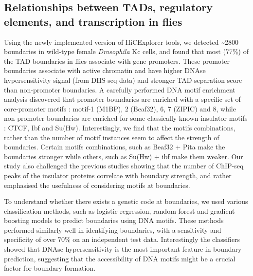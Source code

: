 \documentclass[11pt,twoside]{MPIthesis}
\theoremstyle{definition}
\theoremstyle{definition}
\theoremstyle{definition}
\theoremstyle{remark}
\begin{document}
\subsection{Relationships between TADs, regulatory elements, and
transcription in
flies}\label{relationships-between-tads-regulatory-elements-and-transcription-in-flies}

Using the newly implemented version of HiCExplorer tools, we detected
\textasciitilde{}2800 boundaries in wild-type female \emph{Drosophila}
Kc cells, and found that most (77\%) of the TAD boundaries in flies
associate with gene promoters. These promoter boundaries associate with
active chromatin and have higher DNAse hypersensitivity signal (from
DHS-seq data) and stronger TAD-separation score than non-promoter
boundaries. A carefully performed DNA motif enrichment analysis
discovered that promoter-boundaries are enriched with a specific set of
core-promoter motifs : motif-1 (M1BP), 2 (Beaf32), 6, 7 (ZIPIC) and 8,
while non-promoter boundaries are enriched for some classically known
insulator motifs : CTCF, Ibf and Su(Hw). Interestingly, we find that the
motifs combinations, rather than the number of motif instances seem to
affect the strength of boundaries. Certain motifs combinations, such as
Beaf32 + Pita make the boundaries stronger while others, such as Su(Hw)
+ ibf make them weaker. Our study also challenged the previous studies
showing that the number of ChIP-seq peaks of the insulator proteins
correlate with boundary strength, and rather emphasised the usefulness
of considering motifs at boundaries.

To understand whether there exists a genetic code at boundaries, we used
various classification methods, such as logistic regression, random
forest and gradient boosting models to predict boundaries using DNA
motifs. These methods performed similarly well in identifying
boundaries, with a sensitivity and specificity of over 70\% on an
independent test data. Interestingly the classifiers showed that DNAse
hypersensitivity is the most important feature in boundary prediction,
suggesting that the accessibility of DNA motifs might be a crucial
factor for boundary formation.
\end{document}
